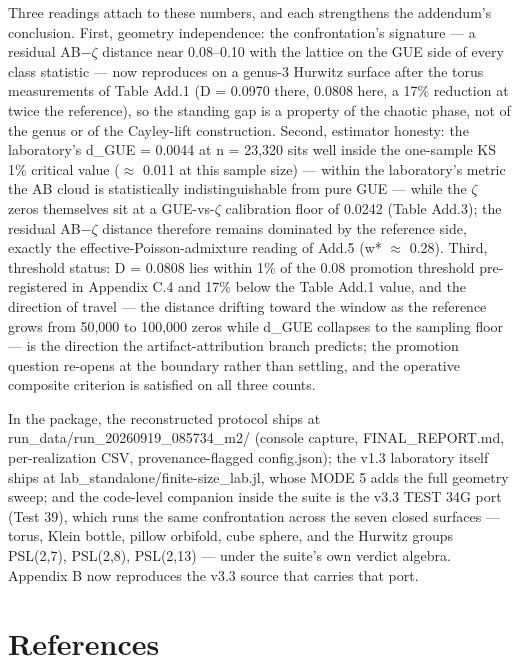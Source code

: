 \documentclass[10pt]{article}
\begin{document}
Three readings attach to these numbers, and each strengthens the addendum’s conclusion. First, geometry independence: the confrontation’s signature --- a residual AB$-$$\zeta$ distance near 0.08--0.10 with the lattice on the GUE side of every class statistic --- now reproduces on a genus-3 Hurwitz surface after the torus measurements of Table Add.1 (D = 0.0970 there, 0.0808 here, a 17\% reduction at twice the reference), so the standing gap is a property of the chaotic phase, not of the genus or of the Cayley-lift construction. Second, estimator honesty: the laboratory’s d\_GUE = 0.0044 at n = 23,320 sits well inside the one-sample KS 1\% critical value ($\approx$ 0.011 at this sample size) --- within the laboratory’s metric the AB cloud is statistically indistinguishable from pure GUE --- while the $\zeta$ zeros themselves sit at a GUE-vs-$\zeta$ calibration floor of 0.0242 (Table Add.3); the residual AB$-$$\zeta$ distance therefore remains dominated by the reference side, exactly the effective-Poisson-admixture reading of Add.5 (w* $\approx$ 0.28). Third, threshold status: D = 0.0808 lies within 1\% of the 0.08 promotion threshold pre-registered in Appendix C.4 and 17\% below the Table Add.1 value, and the direction of travel --- the distance drifting toward the window as the reference grows from 50,000 to 100,000 zeros while d\_GUE collapses to the sampling floor --- is the direction the artifact-attribution branch predicts; the promotion question re-opens at the boundary rather than settling, and the operative composite criterion is satisfied on all three counts.


In the package, the reconstructed protocol ships at run\_data/run\_20260919\_085734\_m2/ (console capture, FINAL\_REPORT.md, per-realization CSV, provenance-flagged config.json); the v1.3 laboratory itself ships at lab\_standalone/finite-size\_lab.jl, whose MODE 5 adds the full geometry sweep; and the code-level companion inside the suite is the v3.3 TEST 34G port (Test 39), which runs the same confrontation across the seven closed surfaces --- torus, Klein bottle, pillow orbifold, cube sphere, and the Hurwitz groups PSL(2,7), PSL(2,8), PSL(2,13) --- under the suite’s own verdict algebra. Appendix B now reproduces the v3.3 source that carries that port.

\section*{References}
\end{document}
